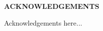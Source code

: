 
\begin{center}
\vspace*{52pt}
{\textbf{ACKNOWLEDGEMENTS}}
\end{center}

Acknowledgements here...

\clearpage
